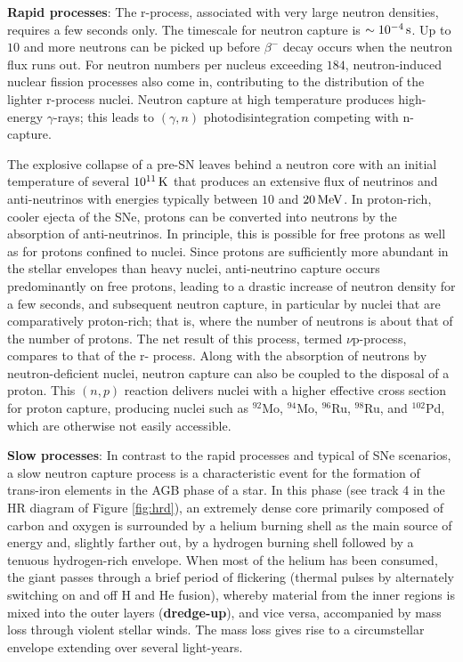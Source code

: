 \documentclass[a4paper,10pt]{article}
\begin{document}
{\noindent}\textbf{Rapid processes}: The r-process, associated with very large neutron densities, requires a few seconds only. The timescale for neutron capture is $\sim10^{-4}\,{\rm s}$. Up to $10$ and more neutrons can be picked up before $\beta^-$ decay occurs when the neutron flux runs out. For neutron numbers per nucleus exceeding $184$, neutron-induced nuclear fission processes also come in, contributing to the distribution of the lighter r-process nuclei. Neutron capture at high temperature produces high-energy $\gamma$-rays; this leads to $(\gamma,n)$ photodisintegration competing with n-capture.

{\noindent}The explosive collapse of a pre-SN leaves behind a neutron core with an initial temperature of several $10^{11}\,{\rm K}$ that produces an extensive flux of neutrinos and anti-neutrinos with energies typically between $10$ and $20\,{\rm MeV}$. In proton-rich, cooler ejecta of the SNe, protons can be converted into neutrons by the absorption of anti-neutrinos. In principle, this is possible for free protons as well as for protons confined to nuclei. Since protons are sufficiently more abundant in the stellar envelopes than heavy nuclei, anti-neutrino capture occurs predominantly on free protons, leading to a drastic increase of neutron density for a few seconds, and subsequent neutron capture, in particular by nuclei that are comparatively proton-rich; that is, where the number of neutrons is about that of the number of protons. The net result of this process, termed $\nu$p-process, compares to that of the r- process. Along with the absorption of neutrons by neutron-deficient nuclei, neutron capture can also be coupled to the disposal of a proton. This $(n,p)$ reaction delivers nuclei with a higher effective cross section for proton capture, producing nuclei such as $^{92}$Mo, $^{94}$Mo, $^{96}$Ru, $^{98}$Ru, and $^{102}$Pd, which are otherwise not easily accessible.

{\noindent}\textbf{Slow processes}: In contrast to the rapid processes and typical of SNe scenarios, a slow neutron capture process is a characteristic event for the formation of trans-iron elements in the AGB phase of a star. In this phase (see track 4 in the HR diagram of Figure \ref{fig:hrd}), an extremely dense core primarily composed of carbon and oxygen is surrounded by a helium burning shell as the main source of energy and, slightly farther out, by a hydrogen burning shell followed by a tenuous hydrogen-rich envelope. When most of the helium has been consumed, the giant passes through a brief period of flickering (thermal pulses by alternately switching on and off H and He fusion), whereby material from the inner regions is mixed into the outer layers (\textbf{dredge-up}), and vice versa, accompanied by mass loss through violent stellar winds. The mass loss gives rise to a circumstellar envelope extending over several light-years.
\end{document}
